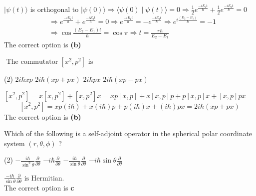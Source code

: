 \begin{enumerate}
\begin{answer}
	$|\psi(t)\rangle$ is orthogonal to $|\psi(0)\rangle \Rightarrow\langle\psi(0) \mid \psi(t)\rangle=0 \Rightarrow \frac{1}{2} e^{\frac{-i E_{1} t}{\hbar}}+\frac{1}{2} e^{\frac{-i E_{2} t}{\hbar}}=0$
	\begin{align*}
	&\Rightarrow e^{\frac{-i E_{1} t}{\hbar}}+e^{\frac{-i E_{2} t}{\hbar}}=0 \Rightarrow e^{\frac{-i E_{1} t}{\hbar}}=-e^{\frac{-i E_{2} t}{\hbar}} \Rightarrow e^{i \frac{\left(E_{2}-E_{1}\right)}{\hbar}}=-1 \\
	&\Rightarrow \cos \frac{\left(E_{2}-E_{1}\right) t}{\hbar}=\cos \pi \Rightarrow t=\frac{\pi \hbar}{E_{2}-E_{1}}
	\end{align*}
	The correct option is \textbf{(b)}
\end{answer}
\begin{minipage}{\textwidth}
	\item $\text { The commutator }\left[x^{2}, p^{2}\right] \text { is }$
\end{minipage}
\begin{tasks}(2)
	\task[\textbf{A.}] $2 i \hbar x p$
	\task[\textbf{B.}]$2 i \hbar(x p+p x)$
	\task[\textbf{C.}]$2 i \hbar p x$
	\task[\textbf{D.}]$2 i \hbar(x p-p x)$
\end{tasks}
\begin{answer}
$\left[x^{2}, p^{2}\right]=x\left[x, p^{2}\right]+\left[x, p^{2}\right] x=x p[x, p]+x[x, p] p+p[x, p] x+[x, p] p x$\\
$$\left[x^{2}, p^{2}\right]=x p(i \hbar)+x(i \hbar) p+p(i \hbar) x+(i \hbar) p x=2 i \hbar(x p+p x)$$
The correct option is \textbf{(b)}	
\end{answer}
\begin{minipage}{\textwidth}
	\item Which of the following is a self-adjoint operator in the spherical polar coordinate system $(r, \theta, \phi)$ ?
\end{minipage}
\begin{tasks}(2)
	\task[\textbf{A.}] $-\frac{i \hbar}{\sin ^{2} \theta} \frac{\partial}{\partial \theta}$
	\task[\textbf{B.}]$-i \hbar \frac{\partial}{\partial \theta}$
	\task[\textbf{C.}] $-\frac{i \hbar}{\sin \theta} \frac{\partial}{\partial \theta}$
	\task[\textbf{D.}] $-i \hbar \sin \theta \frac{\partial}{\partial \theta}$
\end{tasks}
\begin{answer}
	$\frac{-i \hbar}{\sin \theta} \frac{\partial}{\partial \theta} \text { is Hermitian. }$\\
	The correct option is \textbf{c}

\end{answer}
\end{enumerate}
